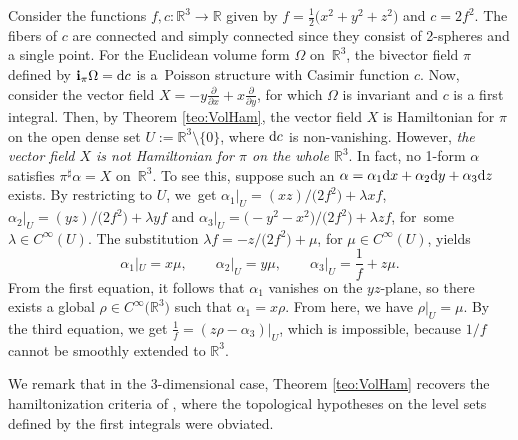 \documentclass[pdftex]{sigma}%
\newcommand{\R}[1]{\mathbb{R}^{#1}}
\newcommand{\dd}{{\rm d}}
\newcommand{\ii}{\mathbf{i}}
\numberwithin{equation}{section}
\begin{document}
\begin{Example}\label{ex:IntSing}
Consider the functions $f,c\colon \R{3} \to \mathbb{R}$ given by $f= \tfrac{1}{2}\big(x^2+y^2+z^2\big)$ and $c = 2f^2$. The fibers of $c$ are connected and simply connected since they consist of 2-spheres and a single point. For the Euclidean volume form $\Omega$ on~$\R{3}$, the bivector field $\pi$ defined by $\ii_{\pi}\Omega = \dd c$ is a~Pois\-son structure with Casimir function $c$. Now, consider the vector field $X=-y\tfrac{\partial}{\partial x}+x\tfrac{\partial}{\partial y}$, for which $\Omega$ is invariant and $c$ is a first integral. Then, by Theorem \ref{teo:VolHam}, the vector field $X$ is Hamiltonian for $\pi$ on the open dense set $U:=\R{3} \setminus \{0\}$, where $\dd c$ is non-vanishing. However, \emph{the vector field $X$ is not Hamiltonian for $\pi$ on the whole $\R{3}$}.
In fact, no 1-form $\alpha$ satisfies $\pi^{\sharp}\alpha = X$ on~$\R{3}$. To see this, suppose such an $\alpha = \alpha_{1}\dd{x} + \alpha_{2}\dd{y} + \alpha_{3}\dd{z}$ exists. By restricting to $U$, we~get $\alpha_1|_{U} = (xz)/\big(2f^2\big) + \lambda xf$, $\alpha_2|_{U} = (yz)/\big(2f^2\big) + \lambda yf$ and $\alpha_3|_{U} = \big({-}y^2-x^2\big)/\big(2f^2\big) + \lambda zf$, for~some $\lambda \in C^{\infty}(U)$. The substitution $\lambda f = -z/\big(2f^2\big) + \mu$, for $\mu \in C^{\infty}(U)$, yields
 \begin{equation*}
 \alpha_1|_{U} = x\mu, \qquad \alpha_2|_{U} = y\mu, \qquad \alpha_3|_{U} = \frac{1}{f} + z\mu.
 \end{equation*}
From the first equation, it follows that $\alpha_{1}$ vanishes on the $yz$-plane, so there exists a global $\rho \in C^{\infty}\big(\R{3}\big)$ such that $\alpha_{1} = x\rho$. From here, we have $\rho|_{U} = \mu$. By the third equation, we get $\tfrac{1}{f} = (z\rho-\alpha_{3})|_{U}$, which is impossible, because ${1}/{f}$ cannot be smoothly extended to $\R{3}$.
\end{Example}

We remark that in the 3-dimensional case, Theorem \ref{teo:VolHam} recovers the hamiltonization criteria of \cite[first theorem]{Gao-2000}, where the topological hypotheses on the level sets defined by the first integrals were obviated.
\end{document}
